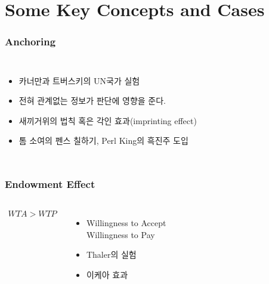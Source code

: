\documentclass[final]{beamer}
\begin{document}
\section{Some Key Concepts and Cases}
%
\begin{frame}\frametitle{Anchoring}\vspace{3em}
%
\begin{columns}[c]
\column{18em}
\begin{itemize}
\item 카너만과 트버스키의 UN국가 실험 
\item 전혀 관계없는 정보가 판단에 영향을 준다.
\item 새끼거위의 법칙 혹은 각인 효과(imprinting effect)
\item 톰 소여의 펜스 칠하기, Perl King의 흑진주 도입 
\end{itemize}
\column{12em}
\hspace{-1em}
\end{columns}
\end{frame}
%
\begin{frame}\frametitle{Endowment Effect}\vspace{3em}
%
\begin{columns}[c]
\column{12em}
\vspace{-2em}
\begin{align*}
WTA > WTP 
\end{align*}
\vspace{-1em}
%
\begin{itemize}
\item Willingness to Accept\\ Willingness to Pay 
\item Thaler의 실험
\item 이케아 효과 
\end{itemize}
\column{18em}
\hspace{-1em}
\end{columns}
\end{frame}
\end{document}
